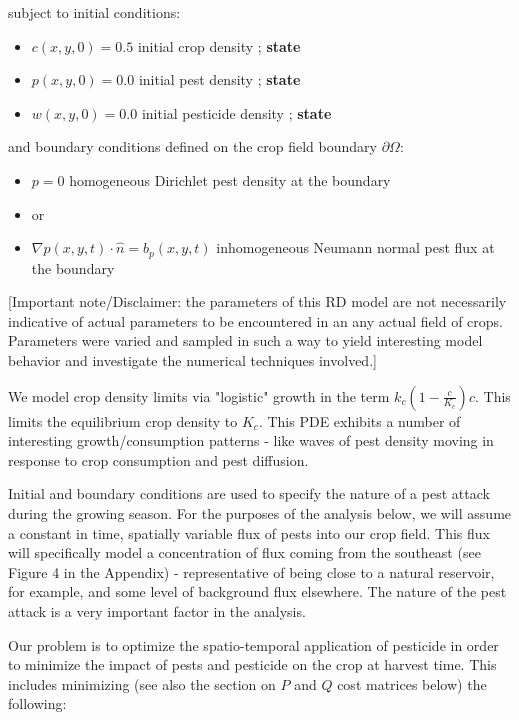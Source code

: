 \documentclass[11pt]{article}
\begin{document}
subject to initial conditions:

\begin{itemize}
\setlength\itemsep{-1pt}
\item $c(x,y,0) = 0.5$ initial crop density ; \textbf{state}
\item $p(x,y,0) = 0.0$ initial pest density ; \textbf{state}
\item $w(x,y,0) = 0.0$ initial pesticide density ; \textbf{state}
\end{itemize}

and boundary conditions defined on the crop field boundary $\partial\Omega$:

\begin{itemize}
\setlength\itemsep{-1pt}
\item $p = 0$ homogeneous Dirichlet pest density at the boundary
\item or
\item $\nabla p(x,y,t) \cdot \hat{n} = b_p(x,y,t)$ inhomogeneous Neumann normal pest flux at the boundary
\end{itemize}

[Important note/Disclaimer: the parameters of this RD model are not necessarily indicative of actual parameters to be encountered in an any actual field of crops. Parameters were varied and sampled in such a way to yield interesting model behavior and investigate the numerical techniques involved.]

We model crop density limits via "logistic" growth in the term $k_c \left( 1 - \frac{c}{K_c} \right) c$. This limits the equilibrium crop density to $K_c$. This PDE exhibits a number of interesting growth/consumption patterns - like waves of pest density moving in response to crop consumption and pest diffusion.

Initial and boundary conditions are used to specify the nature of a pest attack during the growing season. For the purposes of the analysis below, we will assume a constant in time, spatially variable flux of pests into our crop field. This flux will specifically model a concentration of flux coming from the southeast (see Figure 4 in the Appendix) - representative of being close to a natural reservoir, for example, and some level of background flux elsewhere. The nature of the pest attack is a very important factor in the analysis.

Our problem is to optimize the spatio-temporal application of pesticide in order to minimize the impact of pests and pesticide on the crop at harvest time. This includes minimizing (see also the section on $P$ and $Q$ cost matrices below) the following:
\end{document}
